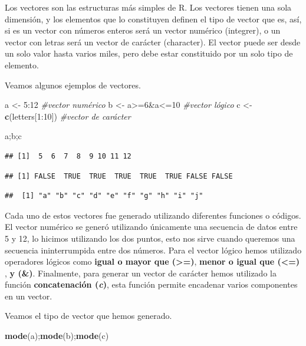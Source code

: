 \documentclass[]{article}
\newenvironment{Shaded}{\begin{snugshade}}{\end{snugshade}}
\newcommand{\KeywordTok}[1]{\textcolor[rgb]{0.13,0.29,0.53}{\textbf{{#1}}}}
\newcommand{\DecValTok}[1]{\textcolor[rgb]{0.00,0.00,0.81}{{#1}}}
\newcommand{\StringTok}[1]{\textcolor[rgb]{0.31,0.60,0.02}{{#1}}}
\newcommand{\CommentTok}[1]{\textcolor[rgb]{0.56,0.35,0.01}{\textit{{#1}}}}
\newcommand{\NormalTok}[1]{{#1}}
\begin{document}
Los vectores son las estructuras más simples de R. Los vectores tienen
una sola dimensión, y los elementos que lo constituyen definen el tipo
de vector que es, así, si es un vector con números enteros será un
vector numérico (integrer), o un vector con letras será un vector de
carácter (character). El vector puede ser desde un solo valor hasta
varios miles, pero debe estar constituido por un solo tipo de elemento.

Veamos algunos ejemplos de vectores.

\begin{Shaded}
\begin{Highlighting}[]
\NormalTok{a <-}\StringTok{ }\DecValTok{5}\NormalTok{:}\DecValTok{12} \CommentTok{#vector numérico}
\NormalTok{b <-}\StringTok{ }\NormalTok{a>=}\DecValTok{6}\NormalTok{&a<=}\DecValTok{10} \CommentTok{#vector lógico}
\NormalTok{c <-}\StringTok{ }\KeywordTok{c}\NormalTok{(letters[}\DecValTok{1}\NormalTok{:}\DecValTok{10}\NormalTok{]) }\CommentTok{#vector de carácter}

\NormalTok{a;b;c}
\end{Highlighting}
\end{Shaded}

\begin{verbatim}
## [1]  5  6  7  8  9 10 11 12
\end{verbatim}

\begin{verbatim}
## [1] FALSE  TRUE  TRUE  TRUE  TRUE  TRUE FALSE FALSE
\end{verbatim}

\begin{verbatim}
##  [1] "a" "b" "c" "d" "e" "f" "g" "h" "i" "j"
\end{verbatim}

Cada uno de estos vectores fue generado utilizando diferentes funciones
o códigos. El vector numérico se generó utilizando únicamente una
secuencia de datos entre 5 y 12, lo hicimos utilizando los dos puntos,
esto nos sirve cuando queremos una secuencia ininterrumpida entre dos
números. Para el vector lógico hemos utilizado operadores lógicos como
\textbf{igual o mayor que (\textgreater{}=)}, \textbf{menor o igual que
(\textless{}=)} , \textbf{y (\&)}. Finalmente, para generar un vector de
carácter hemos utilizado la función \textbf{concatenación (\emph{c})},
esta función permite encadenar varios componentes en un vector.

Veamos el tipo de vector que hemos generado.

\begin{Shaded}
\begin{Highlighting}[]
\KeywordTok{mode}\NormalTok{(a);}\KeywordTok{mode}\NormalTok{(b);}\KeywordTok{mode}\NormalTok{(c)}
\end{Highlighting}
\end{Shaded}
\end{document}

